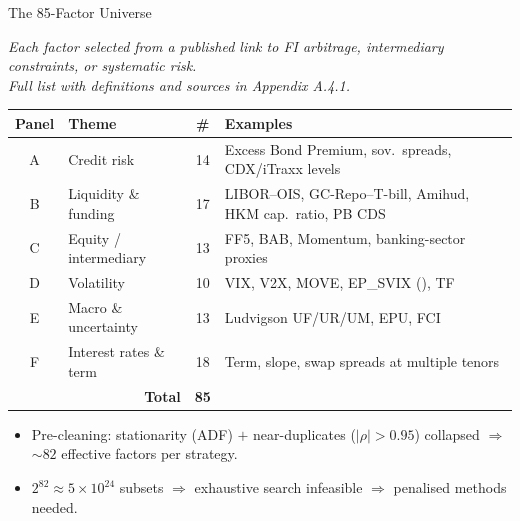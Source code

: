 \documentclass[aspectratio=169,11pt]{beamer}
\begin{document}
\begin{frame}[t]{The 85-Factor Universe}
\centering
\small
\vspace{0.10cm}

\textit{Each factor selected from a published link to FI arbitrage,
intermediary constraints, or systematic risk.\\Full list with definitions
and sources in Appendix A.4.1.}

\vspace{0.25cm}
\renewcommand{\arraystretch}{1.20}
\setlength{\tabcolsep}{6pt}

\begin{tabular}{clcl}
\toprule
\textbf{Panel} & \textbf{Theme} & \textbf{\#} & \textbf{Examples} \\
\midrule
A & Credit risk            & 14 & Excess Bond Premium, sov.\ spreads, CDX/iTraxx levels \\
B & Liquidity \& funding   & 17 & LIBOR--OIS, GC-Repo--T-bill, Amihud, HKM cap.\ ratio, PB CDS \\
C & Equity / intermediary  & 13 & FF5, BAB, Momentum, banking-sector proxies \\
D & Volatility             & 10 & VIX, V2X, MOVE, EP\_SVIX (\citealp{martin2017expected}), TF \\
E & Macro \& uncertainty   & 13 & Ludvigson UF/UR/UM, EPU, FCI \\
F & Interest rates \& term & 18 & Term, slope, swap spreads at multiple tenors \\
\midrule
\multicolumn{2}{r}{\textbf{Total}} & \textbf{85} & \\
\bottomrule
\end{tabular}

\vspace{0.30cm}

\begin{itemize}\itemsep=0.05cm\footnotesize
  \item Pre-cleaning: stationarity (ADF) $+$ near-duplicates ($|\rho| > 0.95$) collapsed
        $\Rightarrow$ $\sim 82$ effective factors per strategy.
  \item $2^{82} \approx 5\times 10^{24}$ subsets $\Rightarrow$ exhaustive search infeasible
        $\Rightarrow$ penalised methods needed.
\end{itemize}

\end{frame}
\end{document}
